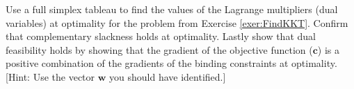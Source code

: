\begin{exercise} Use a full simplex tableau to find the values of the Lagrange multipliers (dual variables) at optimality for the problem from Exercise \ref{exer:FindKKT}. Confirm that complementary slackness holds at optimality. Lastly show that dual feasibility holds by showing that the gradient of the objective function ($\mathbf{c}$) is a positive combination of the gradients of the binding constraints at optimality. [Hint: Use the vector $\mathbf{w}$ you should have identified.]
\end{exercise}
